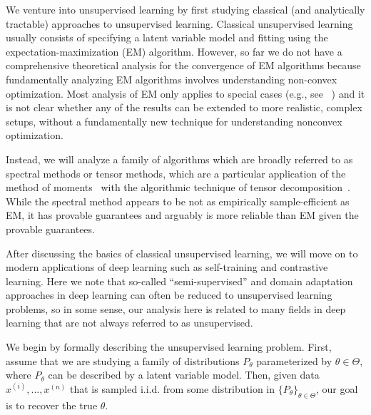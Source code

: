 
We venture into unsupervised learning by first studying classical (and analytically tractable) approaches to unsupervised learning. Classical unsupervised learning usually consists of specifying a latent variable model and fitting using the expectation-maximization (EM) algorithm. However, so far we do not have a comprehensive theoretical analysis for the convergence of EM algorithms because fundamentally analyzing EM algorithms involves understanding non-convex optimization. Most analysis of EM only applies to special cases (e.g., see ~\citet{xu2016global,daskalakis2016ten}) and it is not clear whether any of the results can be extended to more realistic, complex setups, without a fundamentally new technique for understanding nonconvex optimization. 

Instead, we will analyze a family of algorithms which are broadly referred to as spectral methods or tensor methods, which are a particular application of the method of moments~\citep{pearson1894} with the algorithmic technique of tensor decomposition~\citep{anandkumar2015learning}. While the spectral method appears to be not as empirically sample-efficient as EM, it has provable guarantees and arguably is more reliable than EM given the provable guarantees.

After discussing the basics of classical unsupervised learning, we will move on to modern applications of deep learning such as self-training and contrastive learning. Here we note that so-called ``semi-supervised'' and domain adaptation approaches in deep learning can often be reduced to unsupervised learning problems, so in some sense, our analysis here is related to many fields in deep learning that are not always referred to as unsupervised. 


We begin by formally describing the unsupervised learning problem. First, assume that we are studying a family of distributions $P_{\theta}$ parameterized by $\theta \in \Theta$, where $P_{\theta}$ can be described by a latent variable model. Then, given data $x^{(i)},...,x^{(n)}$ that is sampled i.i.d. from some distribution in $\{P_\theta\}_{\theta \in \Theta}$, our goal is to recover the true $\theta$. 

